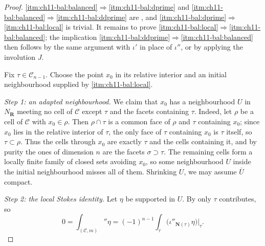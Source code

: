 \begin{proof}
\cref{itm:ch11-bal:balanced}$\Rightarrow$\cref{itm:ch11-bal:dprime} and
\cref{itm:ch11-bal:balanced}$\Rightarrow$\cref{itm:ch11-bal:ddprime} are
, and
\cref{itm:ch11-bal:dprime}$\Rightarrow$\cref{itm:ch11-bal:local} is trivial.
It remains to prove
\cref{itm:ch11-bal:local}$\Rightarrow$\cref{itm:ch11-bal:balanced}; the
implication \cref{itm:ch11-bal:ddprime}$\Rightarrow$\cref{itm:ch11-bal:balanced}
then follows by the same argument with $\iota'$ in place of $\iota''$, or by
applying the involution $J$.

Fix $\tau\in\mathscr C_{n-1}$.  Choose the point $x_0$ in its relative
interior and an initial neighbourhood supplied by
\cref{itm:ch11-bal:local}.

\emph{Step 1: an adapted neighbourhood.}
We claim that $x_0$ has a neighbourhood $U$ in $N_{\mathbf R}$ meeting no
cell of $\mathscr C$ except $\tau$ and the facets containing $\tau$.
Indeed, let $\rho$ be a cell of $\mathscr C$ with $x_0\in\rho$.  Then
$\rho\cap\tau$ is a common face of $\rho$ and $\tau$ containing $x_0$;
since $x_0$ lies in the relative interior of $\tau$, the only face of $\tau$
containing $x_0$ is $\tau$ itself, so $\tau\subset\rho$.  Thus the cells
through $x_0$ are exactly $\tau$ and the cells containing it, and by purity
the ones of dimension $n$ are the facets $\sigma\supset\tau$.  The remaining
cells form a locally finite family of closed sets avoiding $x_0$, so some
neighbourhood $U$ inside the initial neighbourhood misses all of them.
Shrinking $U$, we may assume
$\overline U$ compact.

\emph{Step 2: the local Stokes identity.}
Let $\eta$ be supported in $U$.  By  only
$\tau$ contributes, so
\[
 0=\int_{(\mathscr C,m)}\dprime\eta
  =(-1)^{n-1}\int_\tau\bigl(\iota''_{\mathbf N(\tau)}\eta\bigr)\big|_\tau .
\]


\end{proof}
